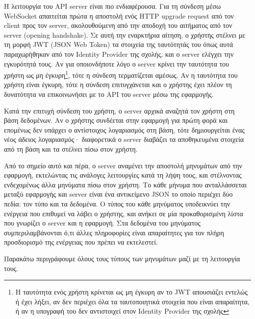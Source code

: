 \documentclass[../thesis.tex]{subfiles}
\begin{document}
\bigskip

Η λειτουργία του API server είναι πιο ενδιαφέρουσα.
Για τη σύνδεση μέσω WebSocket απαιτείται πρώτα η αποστολή ενός HTTP upgrade request από τον client προς τον server, ακολουθούμενη από την αποδοχή του αιτήματος από τον server (opening handshake).
Σε αυτή την εναρκτήρια αίτηση, ο χρήστης στέλνει με τη μορφή JWT (JSON Web Token) τα στοιχεία της ταυτότητάς του όπως αυτά παραχωρήθηκαν από τον Identity Provider της σχολής, και ο server ελέγχει την εγκυρότητά τους.
Αν για οποιονδήποτε λόγο ο server κρίνει την ταυτότητα του χρήστη ως μη έγκυρη\footnote{Η ταυτότητα ενός χρήστη κρίνεται ως μη έγκυρη αν το JWT απουσιάζει εντελώς ή έχει λήξει, αν δεν περιέχει όλα τα ταυτοποιητικά στοιχεία που είναι απαραίτητα, ή αν η υπογραφή του δεν αντιστοιχεί στον Identity Provider της σχολής}, τότε η σύνδεση τερματίζεται αμέσως.
Αν η ταυτότητα του χρήστη είναι έγκυρη, τότε η σύνδεση επιτυγχάνεται και ο χρήστης έχει πλέον τη δυνατότητα να επικοινωνήσει με το API του server μέσω της εφαρμογής.

Κατά την επιτυχή σύνδεση του χρήστη, ο server αρχικά αναζητά τον χρήστη στη βάση δεδομένων.
Αν ο χρήστης συνδέεται στην εφαρμογή για πρώτη φορά και επομένως δεν υπάρχει ο αντίστοιχος λογαριασμός στη βάση, τότε δημιουργείται ένας νέος άδειος λογαριασμός· διαφορετικά ο server διαβάζει τα αποθηκευμένα στοιχεία από τη βάση και τα στέλνει πίσω στον χρήστη.

\bigskip

Από το σημείο αυτό και πέρα, ο server αναμένει την αποστολή μηνυμάτων από την εφαρμογή, εκτελώντας τις ανάλογες λειτουργίες κατά τη λήψη τους, και στέλνοντας ενδεχομένως άλλα μηνύματα πίσω στον χρήστη.
Το κάθε μήνυμα που ανταλλάσσεται μεταξύ εφαρμογής και server είναι ένα αντικείμενο JSON το οποίο περιέχει δύο πεδία: τον τύπο και τα δεδομένα.
Ο τύπος του κάθε μηνύματος υποδεικνύει την ενέργεια που επιθυμεί να λάβει ο χρήστης, και ανήκει σε μία προκαθορισμένη λίστα που γνωρίζει ο server και η εφαρμογή.
Στα δεδομένα του μηνύματος συμπεριλαμβάνονται ό,τι άλλες πληροφορίες είναι απαραίτητες για τον πλήρη προσδιορισμό της ενέργειας που πρέπει να εκτελεστεί.

Παρακάτω περιγράφουμε όλους τους τύπους των μηνυμάτων μαζί με τη λειτουργία τους.
\end{document}
